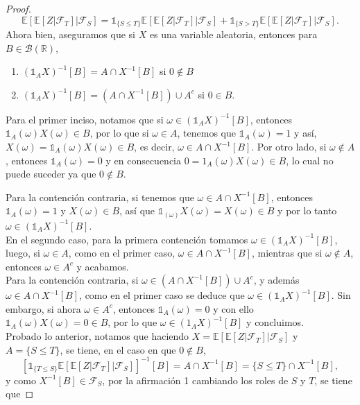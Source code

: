 \documentclass[letterpaper]{article}
\newcommand{\R}{\mathbb{R}}
\newcommand{\F}{\mathcal{F}}
\newcommand{\B}{\mathcal{B}}
\newcommand{\E}{\mathbb{E}}
\newcommand{\1}{\mathds{1}}
\theoremstyle{definition}
\theoremstyle{definition}
\theoremstyle{definition}
\theoremstyle{definition}
\theoremstyle{definition}
\begin{document}
\begin{enumerate}
\begin{proof}
        
            \[
                \E\left[\E\left[Z|\F_T\right]|\F_S\right]=\1_{\{S\leq T\}}\E\left[\E\left[Z|\F_T\right]|\F_S\right]+\1_{\{S>T\}}\E\left[\E\left[Z|\F_T\right]|\F_S\right].
            \]
            Ahora bien, aseguramos que si $X$ es una variable aleatoria, entonces para $B\in \B(\R)$,
            \begin{enumerate}
                \item $(\1_A X)^{-1}[B]=A\cap X^{-1}[B]$ \quad si $0\not \in B$
                \item $(\1_A X)^{-1}[B]=(A\cap X^{-1}[B])\cup A^c$ \quad si $0\in B$.
            \end{enumerate}  
            Para el primer inciso, notamos que si $\omega\in (\1_A X)^{-1}[B]$, entonces $\1_A(\omega)X(\omega)\in B$, por lo que si $\omega \in A$, tenemos que
            $\1_A(\omega)=1$ y así, $X(\omega)=\1_A(\omega)X(\omega)\in B$, es decir, $\omega\in A\cap X^{-1}[B]$. Por otro lado, si $\omega \not \in A$,
            entonces $\1_A(\omega)=0$ y en consecuencia $0=1_A(\omega)X(\omega)\in B$, lo cual no puede suceder ya que $0\not \in B$.
            \newline

            Para la contención contraria, si tenemos que $\omega \in A\cap X^{-1}[B]$, entonces $\1_A(\omega)=1$ y $X(\omega)\in B$, así que
            $\1_(\omega)X(\omega)=X(\omega)\in B$ y por lo tanto $\omega \in(\1_AX)^{-1}[B]$.\\

            En el segundo caso, para la primera contención tomamos $\omega \in (\1_A X)^{-1}[B]$, luego, si $\omega \in A$, como 
            en el primer caso, $\omega \in A\cap X^{-1}[B]$, mientras que si $\omega \not \in A$, entonces $\omega \in A^c$ y acabamos.\\
            
            Para la contención contraria, si $\omega \in (A\cap X^{-1}[B])\cup A^c$, y además $\omega \in A\cap X^{-1}[B]$, como en el primer caso se
            deduce que $\omega\in (\1_A X)^{-1}[B]$. Sin embargo, si ahora $\omega \in A^c$, entonces $\1_A(\omega)=0$ y con ello $\1_A(\omega)X(\omega)=0\in B$,
            por lo que $\omega \in (1_AX)^{-1}[B]$ y concluimos.\\
        
        Probado lo anterior, notamos que haciendo $X=\E\left[\E\left[Z|\F_T\right]|\F_S\right]$ y $A=\{S\leq T\}$, se tiene, en el caso en que $0\not \in B$,
        \[
            \left[\1_{\{T\leq S\}}\E\left[\E\left[Z|\F_T\right]|\F_S\right]\right]^{-1}[B]=A\cap X^{-1}[B]=\{S\leq T\}\cap X^{-1}[B],
        \]
        y como $X^{-1}[B]\in \F_S$, por la afirmación 1 cambiando los roles de $S$ y $T$, se tiene que
        

\end{proof}
\end{enumerate}
\end{document}
